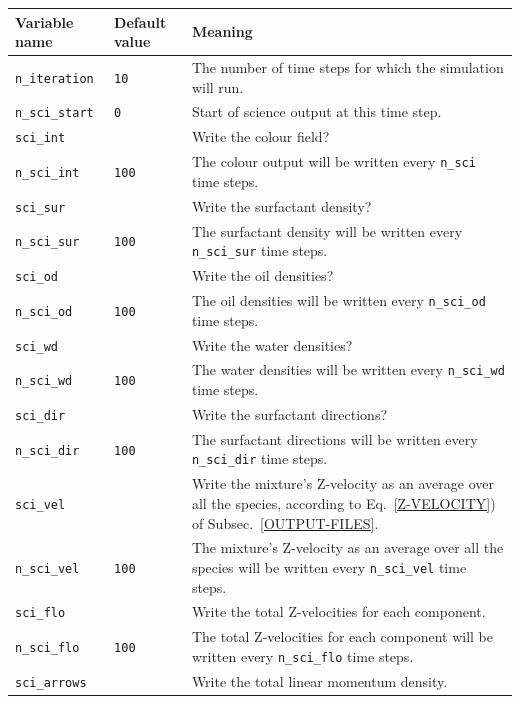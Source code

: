 \documentclass[a4paper]{article}
\begin{document}
\begin{center}
\begin{longtable}{|l|l|p{}|}
\hline
Variable name	&	Default value	& Meaning	\\
\hline 
{\tt n\_iteration  }	&	{\tt 10 }	&
		The number of time steps for which the simulation will
		run.\\
{\tt n\_sci\_start  }	&	{\tt 0 }	&
		Start of science output at this time step. \\
{\tt sci\_int  }	&	{\tt \ffalse }	&
		Write the colour field? \\
{\tt n\_sci\_int  }  & {\tt 100 }  & 
    The colour output will be written every {\tt n\_sci}
    time steps.\\
{\tt sci\_sur  }	&	{\tt \ffalse }	&
		Write the surfactant density? \\
{\tt n\_sci\_sur  }	&	{\tt 100 }	&
		The surfactant density will be written every {\tt n\_sci\_sur}
		time steps.\\
{\tt sci\_od  }	&	{\tt \ffalse }	&
		Write the oil densities? \\
{\tt n\_sci\_od  }	&	{\tt 100 }	&
		The oil densities will be written every 
		{\tt n\_sci\_od} time steps.\\
{\tt sci\_wd  }	&	{\tt \ffalse }	&
		Write the water densities? \\
{\tt n\_sci\_wd  }	&	{\tt 100 }	&
		The water densities will be written every 
		{\tt n\_sci\_wd} time steps.\\
{\tt sci\_dir  }	&	{\tt \ffalse }	&
		Write the surfactant directions? \\
{\tt n\_sci\_dir  }	&	{\tt 100 }	&
		The surfactant directions will be written every
		{\tt n\_sci\_dir}  time steps.\\		
{\tt sci\_vel  }	&	{\tt \ffalse }	&
		Write the mixture's Z-velocity as an average over all
		the species, according to Eq.~\eqref{Z-VELOCITY}) of
		Subsec.~\ref{OUTPUT-FILES}. \\
{\tt n\_sci\_vel  }	&	{\tt 100 }	&
		The mixture's Z-velocity as an average over all the
		species will be written every {\tt n\_sci\_vel}  time
		steps.\\		 
{\tt sci\_flo  }	&	{\tt \ffalse }	&
		Write the total Z-velocities for each component. \\
{\tt n\_sci\_flo  }	&	{\tt 100 }	&
		The total Z-velocities for each component will be written every
		{\tt n\_sci\_flo}  time steps.\\		
{\tt sci\_arrows  }	&	{\tt \ffalse }	&
		Write the total linear momentum density. \\

\end{longtable}
\end{center}
\end{document}
